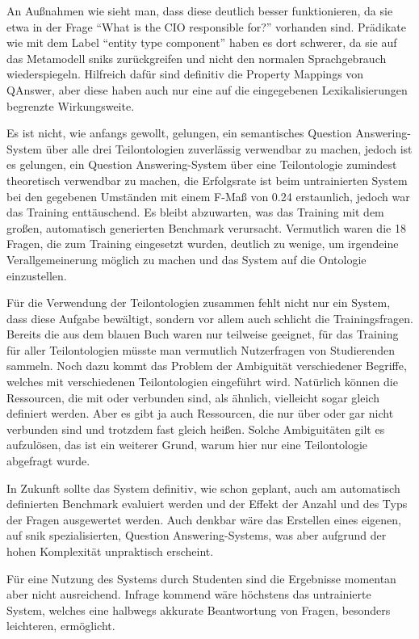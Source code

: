 An Außnahmen wie  sieht man, dass diese deutlich besser funktionieren, da sie etwa in der Frage \enquote{What is the CIO responsible for?} vorhanden sind.
Prädikate wie  mit dem Label \enquote{entity type component} haben es dort schwerer, da sie auf das Metamodell \ac{snik}s zurückgreifen
und nicht den normalen Sprachgebrauch wiederspiegeln.
Hilfreich dafür sind definitiv die Property Mappings von QAnswer, aber diese haben auch nur eine auf die eingegebenen Lexikalisierungen begrenzte Wirkungsweite.

Es ist nicht, wie anfangs gewollt, gelungen, ein semantisches Question Answering-System über alle drei Teilontologien zuverlässig verwendbar zu machen,
jedoch ist es gelungen, ein Question Answering-System über eine Teilontologie zumindest theoretisch verwendbar zu machen, die Erfolgsrate ist beim untrainierten System bei den gegebenen Umständen mit einem F-Maß von 0.24 erstaunlich, jedoch war das Training enttäuschend.
Es bleibt abzuwarten, was das Training mit dem großen, automatisch generierten Benchmark verursacht.
Vermutlich waren die 18 Fragen, die zum Training eingesetzt wurden, deutlich zu wenige, um irgendeine Verallgemeinerung möglich zu machen und das System auf die Ontologie einzustellen.

Für die Verwendung der Teilontologien zusammen fehlt nicht nur ein System, dass diese Aufgabe bewältigt, sondern vor allem auch schlicht die Trainingsfragen.
Bereits die aus dem blauen Buch waren nur teilweise geeignet, für das Training für aller Teilontologien müsste man vermutlich Nutzerfragen von Studierenden sammeln.
Noch dazu kommt das Problem der Ambiguität verschiedener Begriffe, welches mit verschiedenen Teilontologien eingeführt wird.
Natürlich können die Ressourcen, die mit  oder  verbunden sind, als ähnlich, vielleicht sogar gleich definiert werden.
Aber es gibt ja auch Ressourcen, die nur über  oder gar nicht verbunden sind und trotzdem fast gleich heißen.
Solche Ambiguitäten gilt es aufzulösen, das ist ein weiterer Grund, warum hier nur eine Teilontologie abgefragt wurde.

In Zukunft sollte das System definitiv, wie schon geplant, auch am automatisch definierten Benchmark evaluiert werden und der Effekt der Anzahl und des Typs der Fragen ausgewertet werden.
Auch denkbar wäre das Erstellen eines eigenen, auf \ac{snik} spezialisierten, Question Answering-Systems, was aber aufgrund der hohen Komplexität unpraktisch erscheint.

Für eine Nutzung des Systems durch Studenten sind die Ergebnisse momentan aber nicht ausreichend.
Infrage kommend wäre höchstens das untrainierte System, welches eine halbwegs akkurate Beantwortung von Fragen, besonders leichteren, ermöglicht.
